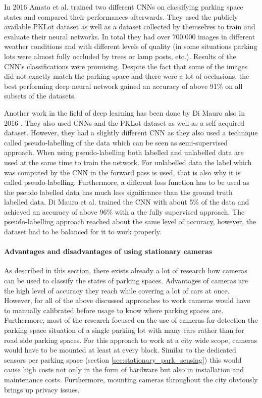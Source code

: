 In 2016 Amato et al. \cite{Amato2016} trained two different CNNs on classifying parking space states and compared their performances afterwards. They used the publicly available PKLot dataset as well as a dataset collected by themselves to train and evaluate their neural networks. In total they had over 700.000 images in different weather conditions and with different levels of quality (in some situations parking lots were almost fully occluded by trees or lamp posts, etc.). Results of the CNN's classifications were promising. Despite the fact that some of the images did not exactly match the parking space and there were a lot of occlusions, the best performing deep neural network gained an accuracy of above 91\% on all subsets of the datasets. 

Another work in the field of deep learning has been done by Di Mauro also in 2016 \cite{DiMauro2016}. They also used CNNs and the PKLot dataset as well as a self acquired dataset. However, they had a slightly different CNN as they also used a technique called pseudo-labelling of the data which can be seen as semi-supervised approach. When using pseudo-labelling both labelled and unlabelled data are used at the same time to train the network. For unlabelled data the label which was computed by the CNN in the forward pass is used, that is also why it is called pseudo-labelling. Furthermore, a different loss function has to be used as the pseudo labelled data has much less significance than the ground truth labelled data. Di Mauro et al. trained the CNN with about 5\% of the data and achieved an accuracy of above 96\% with a the fully supervised approach. The pseudo-labelling approach reached about the same level of accuracy, however, the dataset had to be balanced for it to work properly.


\paragraph{Advantages and disadvantages of using stationary cameras}

As described in this section, there exists already a lot of research how cameras can be used to classify the states of parking spaces. Advantages of cameras are the high level of accuracy they reach while covering a lot of cars at once. However, for all of the above discussed approaches to work cameras would have to manually calibrated before usage to know where parking spaces are. Furthermore, most of the research focused on the use of cameras for detection the parking space situation of a single parking lot with many cars rather than for road side parking spaces. For this approach to work at a city wide scope, cameras would have to be mounted at least at every block. Similar to the dedicated sensors per parking space (section \ref{sec:stationary_park_sensing}) this would cause high costs not only in the form of hardware but also in installation and maintenance costs. Furthermore, mounting cameras throughout the city obviously brings up privacy issues.





